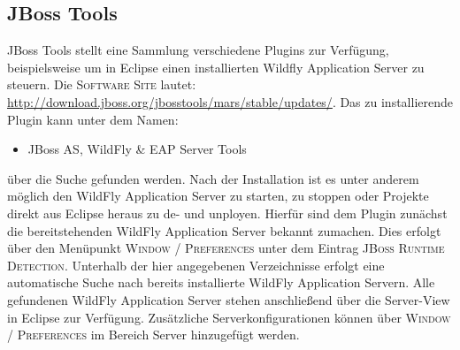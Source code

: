 \subsection{JBoss Tools}
JBoss Tools stellt eine Sammlung verschiedene Plugins zur Verfügung, beispielsweise um in Eclipse einen installierten Wildfly Application Server zu steuern. Die \textsc{Software Site} lautet: \url{http://download.jboss.org/jbosstools/mars/stable/updates/}. Das zu installierende Plugin kann unter dem Namen:
\begin{itemize}\renewcommand{\labelitemi}{\itemizecheck}
	\item JBoss AS, WildFly \& EAP Server Tools
\end{itemize}
über die Suche gefunden werden. Nach der Installation ist es unter anderem möglich den WildFly Application Server zu starten, zu stoppen oder Projekte direkt aus Eclipse heraus zu de- und unployen. Hierfür sind dem Plugin zunächst die bereitstehenden WildFly Application Server bekannt zumachen. Dies erfolgt über den Menüpunkt \textsc{Window / Preferences} unter dem Eintrag \textsc{JBoss Runtime Detection}. Unterhalb der hier angegebenen Verzeichnisse erfolgt eine automatische Suche nach bereits installierte WildFly Application Servern. Alle gefundenen WildFly Application Server stehen anschließend über die Server-View in Eclipse zur Verfügung. Zusätzliche Serverkonfigurationen können über \textsc{Window / Preferences} im Bereich Server hinzugefügt werden.

